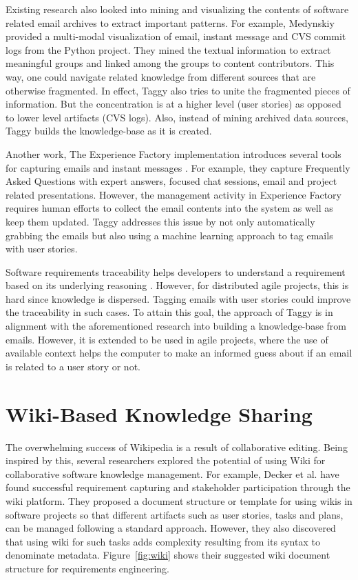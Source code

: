 Existing research also looked into mining and visualizing the contents of software related email archives to extract important patterns. For example, Medynskiy provided a multi-modal visualization of email, instant message and CVS commit logs from the Python project\cite{using_hybrid}. They mined the textual information to extract meaningful groups and linked among the groups to content contributors. This way, one could navigate related knowledge from different sources that are otherwise fragmented. In effect, Taggy also tries to unite the fragmented pieces of information. But the concentration is at a higher level (user stories) as opposed to lower level artifacts (CVS logs). Also, instead of mining archived data sources, Taggy builds the knowledge-base as it is created.

Another work, The Experience Factory implementation introduces several tools for capturing emails and instant messages \cite{implementing_an_experience}. For example, they capture Frequently Asked Questions with expert answers, focused chat sessions, email and project related presentations. However, the management activity in Experience Factory requires human efforts to collect the email contents into the system as well as keep them updated. Taggy addresses this issue by not only automatically grabbing the emails but also using a machine learning approach to tag emails with user stories.

Software requirements traceability helps developers to understand a requirement based on its underlying reasoning \cite{automating_requirements}. However, for distributed agile projects, this is hard since knowledge is dispersed. Tagging emails with user stories could improve the traceability in such cases. To attain this goal, the approach of Taggy is in alignment with the aforementioned research into building a knowledge-base from emails. However, it is extended to be used in agile projects, where the use of available context helps the computer to make an informed guess about if an email is related to a user story or not.

\section{Wiki-Based Knowledge Sharing}
The overwhelming success of Wikipedia \cite{wikipedia} is a result of collaborative editing. Being inspired by this, several researchers explored the potential of using Wiki for collaborative software knowledge management. For example, Decker et al. have found successful requirement capturing and stakeholder participation through the wiki platform\cite{wiki_based}. They proposed a document structure or template for using wikis in software projects so that different artifacts such as user stories, tasks and plans, can be managed following a standard approach. However, they also discovered that using wiki for such tasks adds complexity resulting from its syntax to denominate metadata. Figure~\ref{fig:wiki} shows their suggested wiki document structure for requirements engineering.

